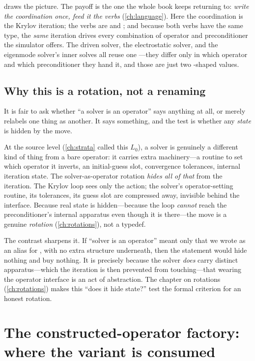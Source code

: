  draws the picture. The payoff is the one the whole book
keeps returning to: \emph{write the coordination once, feed it the verbs}
(\cref{ch:language}). Here the coordination is the Krylov iteration; the verbs are
 and ; and because both verbs have the
same type, the \emph{same} iteration drives every combination of operator and
preconditioner the simulator offers. The driven solver, the electrostatic solver, and
the eigenmode solver's inner solves all reuse one ---they differ only in
which operator and which preconditioner they hand it, and those are just two
-shaped values.

\subsection{Why this is a rotation, not a renaming}

It is fair to ask whether ``a solver is an operator'' says anything at all, or merely
relabels one thing as another. It says something, and the test is whether any
\emph{state} is hidden by the move.

At the source level (\cref{ch:strata} called this $L_0$), a solver is genuinely a
different kind of thing from a bare operator: it carries extra machinery---a routine to
set which operator it inverts, an initial-guess slot, convergence tolerances, internal
iteration state. The solver-as-operator rotation \emph{hides all of that} from the
iteration. The Krylov loop sees only the  action; the solver's
operator-setting routine, its tolerances, its guess slot are compressed away,
invisible behind the interface. Because real state is hidden---because the loop
\emph{cannot} reach the preconditioner's internal apparatus even though it is
there---the move is a genuine \emph{rotation} (\cref{ch:rotations}), not a typedef.

The contrast sharpens it. If ``solver is an operator'' meant only that we wrote
 as an alias for , with no extra structure underneath,
then the statement would hide nothing and buy nothing. It is precisely because the
solver \emph{does} carry distinct apparatus---which the iteration is then prevented
from touching---that wearing the operator interface is an act of abstraction. The
chapter on rotations (\cref{ch:rotations}) makes this ``does it hide state?'' test the
formal criterion for an honest rotation.

\section{The constructed-operator factory: where the variant is consumed}

